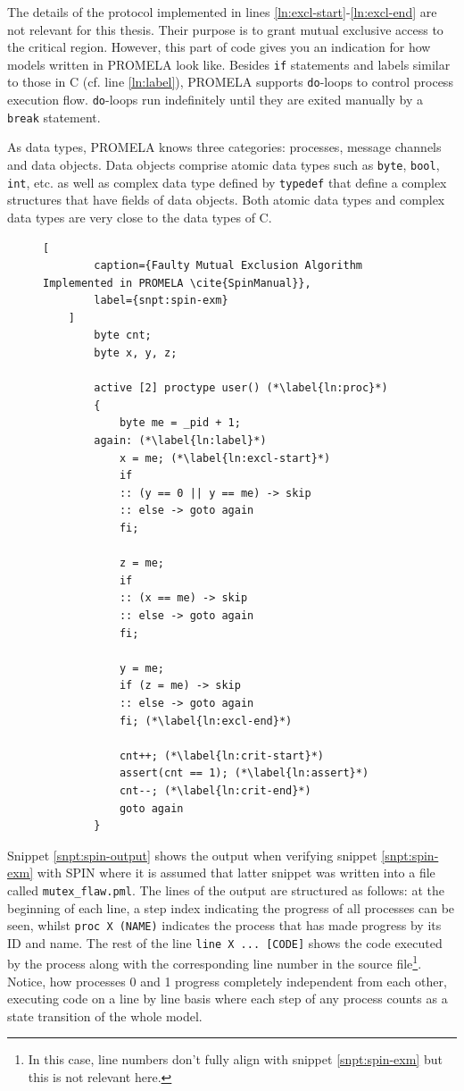 The details of the protocol implemented in lines \ref{ln:excl-start}-\ref{ln:excl-end} are not relevant for this thesis.
Their purpose is to grant mutual exclusive access to the critical region.
However, this part of code gives you an indication for how models written in PROMELA look like.
Besides \lstinline{if} statements and labels similar to those in C (cf. line \ref{ln:label}), PROMELA supports \lstinline{do}-loops to control process execution flow.
\lstinline{do}-loops run indefinitely until they are exited manually by a \lstinline{break} statement.

As data types, PROMELA knows three categories: processes, message channels and data objects.
Data objects comprise atomic data types such as \lstinline{byte}, \lstinline{bool}, \lstinline{int}, etc. as well as complex data type defined by \lstinline{typedef} that define a complex structures that have fields of data objects.
Both atomic data types and complex data types are very close to the data types of C.

\begin{figure}
    \begin{lstlisting}[
        caption={Faulty Mutual Exclusion Algorithm Implemented in PROMELA \cite{SpinManual}},
        label={snpt:spin-exm}
    ]
        byte cnt;
        byte x, y, z;

        active [2] proctype user() (*\label{ln:proc}*)
        {
            byte me = _pid + 1;
        again: (*\label{ln:label}*)
            x = me; (*\label{ln:excl-start}*)
            if
            :: (y == 0 || y == me) -> skip
            :: else -> goto again
            fi;

            z = me;
            if
            :: (x == me) -> skip
            :: else -> goto again
            fi;

            y = me;
            if (z = me) -> skip
            :: else -> goto again
            fi; (*\label{ln:excl-end}*)

            cnt++; (*\label{ln:crit-start}*)
            assert(cnt == 1); (*\label{ln:assert}*)
            cnt--; (*\label{ln:crit-end}*)
            goto again
        }
    \end{lstlisting}
\end{figure}

Snippet \ref{snpt:spin-output} shows the output when verifying snippet \ref{snpt:spin-exm} with SPIN where it is assumed that latter snippet was written into a file called \lstinline{mutex_flaw.pml}.
The lines of the output are structured as follows: at the beginning of each line, a step index indicating the progress of all processes can be seen, whilst \lstinline{proc X (NAME)} indicates the process that has made progress by its ID and name.
The rest of the line \lstinline{line X ... [CODE]} shows the code executed by the process along with the corresponding line number in the source file\footnote{%
    In this case, line numbers don't fully align with snippet \ref{snpt:spin-exm} but this is not relevant here.
}.
Notice, how processes 0 and 1 progress completely independent from each other, executing code on a line by line basis where each step of any process counts as a state transition of the whole model.

